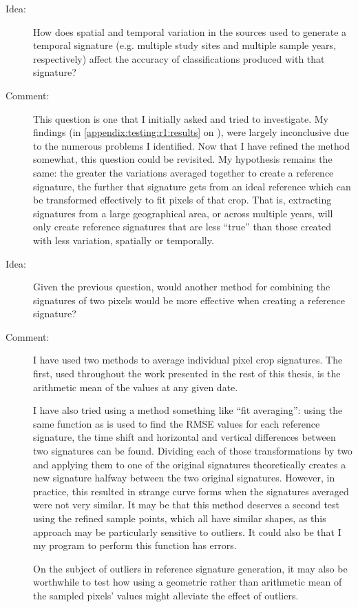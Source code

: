 \begin{description}
\item[Idea:] How does spatial and temporal variation in the sources used to generate a temporal signature (e.g. multiple study sites and multiple sample years, respectively) affect the accuracy of classifications produced with that signature?

\item[Comment:] This question is one that I initially asked and tried to investigate. My findings (in \autoref{appendix:testing:r1:results} on ), were largely inconclusive due to the numerous problems I identified. Now that I have refined the method somewhat, this question could be revisited. My hypothesis remains the same: the greater the variations averaged together to create a reference signature, the further that signature gets from an ideal reference which can be transformed effectively to fit pixels of that crop. That is, extracting signatures from a large geographical area, or across multiple years, will only create reference signatures that are less ``true'' than those created with less variation, spatially or temporally.

\item[Idea:] Given the previous question, would another method for combining the signatures of two pixels would be more effective when creating a reference signature?

\item[Comment:] I have used two methods to average individual pixel crop signatures. The first, used throughout the work presented in the rest of this thesis, is the arithmetic mean of the values at any given date.

I have also tried using a method something like ``fit averaging'': using the same function as is used to find the RMSE values for each reference signature, the time shift and horizontal and vertical differences between two signatures can be found. Dividing each of those transformations by two and applying them to one of the original signatures theoretically creates a new signature halfway between the two original signatures. However, in practice, this resulted in strange curve forms when the signatures averaged were not very similar. It may be that this method deserves a second test using the refined sample points, which all have similar shapes, as this approach may be particularly sensitive to outliers. It could also be that I my program to perform this function has errors.

On the subject of outliers in reference signature generation, it may also be worthwhile to test how using a geometric rather than arithmetic mean of the sampled pixels’ values might alleviate the effect of outliers.
\end{description}

